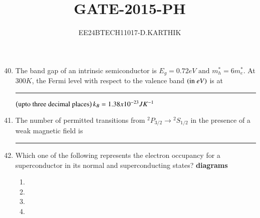 \documentclass[journal]{IEEEtran}
\begin{document}

\vspace{3cm}

\title{GATE-2015-PH}
\author{EE24BTECH11017-D.KARTHIK}
\maketitle

\renewcommand{\thefigure}{\theenumi}
\renewcommand{\thetable}{\theenumi}
\setlength{\intextsep}{10pt}


\renewcommand{\thetable}{\theenumi}

\begin{enumerate}
    \setcounter{enumi}{39}

\item The band gap of an intrinsic semiconductor is $E_g = 0.72 eV \text{ and } m^*_h = 6m^*_e. $ At $300K$, the Fermi level with respect to the valence band $\left(\text{in } eV\right)$ is at \rule{1.7cm}{0.2mm} $\left(\text{upto three decimal places}\right) k_B = 1.38 x 10^{-23}JK^{-1}$
\item The number of permitted transitions from ${{}^{2}P_{3/2} \rightarrow {}^{2}S_{1/2}}
$ in the presence of a weak magnetic field is \rule{3cm}{0.2mm}
\item Which one of the following represents the electron occupancy for a superconductor in its normal and superconducting states?
\textbf{
diagrams
}
\begin{multicols}{2}
\begin{enumerate}

    \item 
    \item 
    \item 
    
    \item 
\end{enumerate}
\end{multicols}







\end{enumerate}
\end{document}
